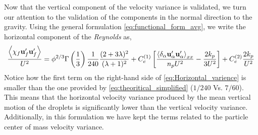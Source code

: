 Now that the vertical component of the velocity variance is validated, we turn our attention to the validation of the components in the normal direction to the gravity. 
Using the general formulation \ref{eq:functional_form_avg}, we write the horizontal component of the \textit{Reynolds} as, 
\begin{equation}
    \frac{\avg{\chi_f \textbf{u}_f'\textbf{u}_f'}}{U^2}
    = \phi^{2/3}\Gamma\left(\frac{1}{3}\right) \frac{1}{240}\frac{(2+3\lambda)^2 }{(\lambda+1)^2}
    + 
    C^{(1)}_e \left[
    \frac{\pavg{\textbf{u}_\alpha'\textbf{u}_\alpha'}_{xx}}{n_p U^2}
    - \frac{2k_p}{3U^2}  
    \right]
    + C^{(2)}_e
    \frac{2k_p}{U^2}  
    \label{eq:Horizontal_varience}
\end{equation}
Notice how the first term on the right-hand side of \ref{eq:Horizontal_varience} is smaller than the one provided by \ref{eq:theoritical_simplified} ($1/240$ Vs. $7/60$). 
This means that the horizontal velocity variance produced by the mean vertical motion of the droplets is significantly lower than the vertical velocity variance. 
Additionally, in this formulation we have kept the terms related to the particle center of mass velocity variance. 


